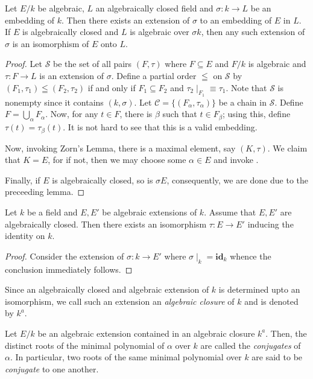 \begin{theorem}
    Let $E/k$ be algebraic, $L$ an algebraically closed field and $\sigma: k\to L$ be an embedding of $k$. Then there exists an extension of $\sigma$ to an embedding of $E$ in $L$. If $E$ is algebraically closed and $L$ is algebraic over $\sigma k$, then any such extension of $\sigma$ is an isomorphism of $E$ onto $L$.
\end{theorem}
\begin{proof}
    Let $\mathscr S$ be the set of all pairs $(F,\tau)$ where $F\subseteq E$ and $F/k$ is algebraic and $\tau: F\to L$ is an extension of $\sigma$. Define a partial order $\leqq$ on $\mathscr S$ by $(F_1,\tau_1)\leqq(F_2,\tau_2)$ if and only if $F_1\subseteq F_2$ and $\tau_2\mid_{F_1}\equiv\tau_1$. Note that $\mathscr S$ is nonempty since it contains $(k,\sigma)$. Let $\mathscr C = \{(F_\alpha,\tau_\alpha)\}$ be a chain in $\mathscr S$. Define $F = \bigcup_{\alpha} F_\alpha$. Now, for any $t\in F$, there is $\beta$ such that $t\in F_\beta$; using this, define $\tau(t) = \tau_\beta(t)$. It is not hard to see that this is a valid embedding.

    Now, invoking Zorn's Lemma, there is a maximal element, say $(K,\tau)$. We claim that $K = E$, for if not, then we may choose some $\alpha\in E$ and invoke .

    Finally, if $E$ is algebraically closed, so is $\sigma E$, consequently, we are done due to the preceeding lemma.
\end{proof}

\begin{corollary}
    Let $k$ be a field and $E, E'$ be algebraic extensions of $k$. Assume that $E, E'$ are algebraically closed. Then there exists an isomorphism $\tau: E\to E'$ inducing the identity on $k$.
\end{corollary}
\begin{proof}
    Consider the extension of $\sigma: k\to E'$ where $\sigma\mid_k = \mathbf{id}_k$ whence the conclusion immediately follows.
\end{proof}

Since an algebraically closed and algebraic extension of $k$ is determined upto an isomorphism, we call such an extension an \textit{algebraic closure} of $k$ and is denoted by $k^a$.

\begin{definition}[Conjugates]
    Let $E/k$ be an algebraic extension contained in an algebraic closure $k^a$. Then, the distinct roots of the minimal polynomial of $\alpha$ over $k$ are called the \textit{conjugates} of $\alpha$. In particular, two roots of the same minimal polynomial over $k$ are said to be \textit{conjugate} to one another.
\end{definition}

